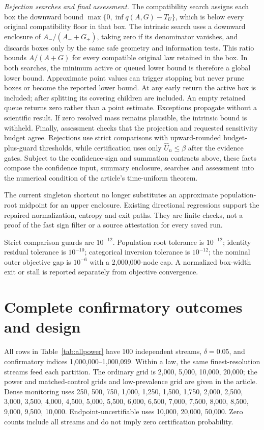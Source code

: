 \documentclass[10pt]{article}
\begin{document}
\emph{Rejection searches and final assessment.} The compatibility search assigns each box the downward bound $\max\{0,\inf q(A,G)-T_U\}$, which is below every original compatibility floor in that box. The intrinsic search uses a downward enclosure of $A_-/(A_-+G_+)$, taking zero if its denominator vanishes, and discards boxes only by the same safe geometry and information tests. This ratio bounds $A/(A+G)$ for every compatible original law retained in the box. In both searches, the minimum active or queued lower bound is therefore a global lower bound. Approximate point values can trigger stopping but never prune boxes or become the reported lower bound. At any early return the active box is included; after splitting its covering children are included. An empty retained queue returns zero rather than a point estimate. Exceptions propagate without a scientific result. If zero resolved mass remains plausible, the intrinsic bound is withheld. Finally, assessment checks that the projection and requested sensitivity budget agree. Rejections use strict comparisons with upward-rounded budget-plus-guard thresholds, while certification uses only $\widehat U_n\le\beta$ after the evidence gates. Subject to the confidence-sign and summation contracts above, these facts compose the confidence input, summary enclosure, searches and assessment into the numerical condition of the article's time-uniform theorem.

The current singleton shortcut no longer substitutes an approximate population-root midpoint for an upper enclosure. Existing directional regressions support the repaired normalization, entropy and exit paths. They are finite checks, not a proof of the fast sign filter or a source attestation for every saved run.

Strict comparison guards are $10^{-12}$. Population root tolerance is $10^{-12}$; identity residual tolerance is $10^{-10}$; categorical inversion tolerance is $10^{-12}$; the nominal outer objective gap is $10^{-6}$ with a 2,000,000-node cap. A normalized box-width exit or stall is reported separately from objective convergence.

\section{Complete confirmatory outcomes and design}
All rows in Table~\ref{tab:allpower} have 100 independent streams, $\delta=0.05$, and confirmatory indices 1,000,000--1,000,099. Within a law, the same finest-resolution streams feed each partition. The ordinary grid is 2,000, 5,000, 10,000, 20,000; the power and matched-control grids and low-prevalence grid are given in the article. Dense monitoring uses 250, 500, 750, 1,000, 1,250, 1,500, 1,750, 2,000, 2,500, 3,000, 3,500, 4,000, 4,500, 5,000, 5,500, 6,000, 6,500, 7,000, 7,500, 8,000, 8,500, 9,000, 9,500, 10,000. Endpoint-uncertifiable uses 10,000, 20,000, 50,000. Zero counts include all streams and do not imply zero certification probability.
\end{document}
